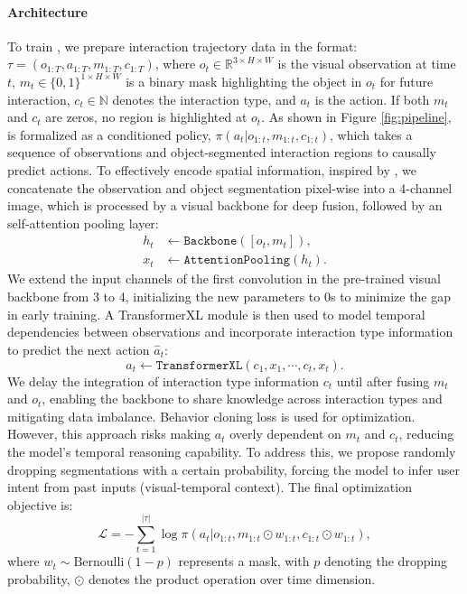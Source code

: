 \documentclass[11pt, a4paper, logo, two column]{craftjarvis}
\begin{document}
\paragraph{\agent Architecture}
To train \agent, we prepare interaction trajectory data in the format:
$\tau = (o_{1:T}, a_{1:T}, m_{1:T}, c_{1:T})$,
where $o_t \in \mathbb{R}^{3 \times H \times W}$ is the visual observation at time $t$, $m_t \in \{0, 1\}^{1 \times H \times W}$ is a binary mask highlighting the object in $o_t$ for future interaction, $c_t \in \mathbb{N}$ denotes the interaction type, and $a_t$ is the action. If both $m_t$ and $c_t$ are zeros, no region is highlighted at $o_t$. 
As shown in Figure \ref{fig:pipeline}, \agent is formalized as a conditioned policy, $\pi(a_t | o_{1:t}, m_{1:t}, c_{1:t})$, which takes a sequence of observations and object-segmented interaction regions to causally predict actions. To effectively encode spatial information, inspired by \cite{controlnet}, we concatenate the observation and object segmentation pixel-wise into a 4-channel image, which is processed by a visual backbone for deep fusion, followed by an self-attention pooling layer: 
\begin{align}
h_t &\leftarrow \texttt{Backbone}([o_t, m_t]), \\
x_t &\leftarrow \texttt{AttentionPooling}(h_t). 
\end{align}
We extend the input channels of the first convolution in the pre-trained visual backbone from 3 to 4, initializing the new parameters to $0$s to minimize the gap in early training. A TransformerXL \citep{transformerxl, vpt} module is then used to model temporal dependencies between observations and incorporate interaction type information to predict the next action $\hat{a}_t$: 
\begin{equation}
    \hat{a}_t \leftarrow \texttt{TransformerXL}(c_1, x_1, \cdots, c_t, x_t). 
\end{equation}
We delay the integration of interaction type information $c_t$ until after fusing $m_t$ and $o_t$, enabling the backbone to share knowledge across interaction types and mitigating data imbalance. Behavior cloning loss is used for optimization. However, this approach risks making $a_t$ overly dependent on $m_t$ and $c_t$, reducing the model's temporal reasoning capability. To address this, we propose randomly dropping segmentations with a certain probability, forcing the model to infer user intent from past inputs (visual-temporal context). 
The final optimization objective is: 
\begin{equation}
    \mathcal{L} = -\sum_{t=1}^{|\tau|} \log \pi(a_t | o_{1:t}, m_{1:t} \odot w_{1:t}, c_{1:t} \odot w_{1:t}), 
\end{equation}
where $w_t \sim \text{Bernoulli}(1-p)$ represents a mask, with $p$ denoting the dropping probability, $\odot$ denotes the product operation over time dimension. 
\end{document}
